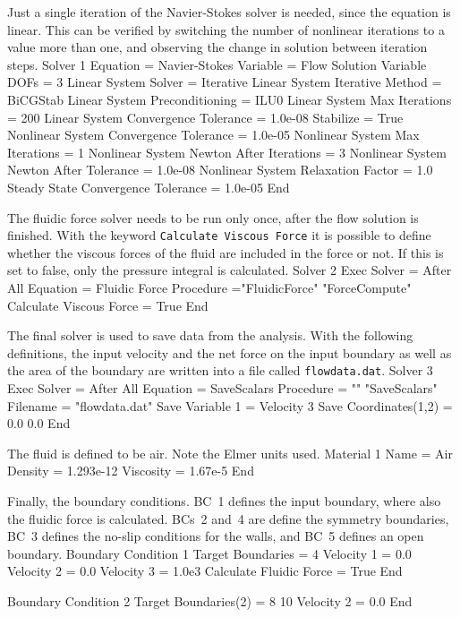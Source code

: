 Just a single iteration of the Navier-Stokes solver is needed, since
the equation is linear. This can be verified by switching the number
of nonlinear iterations to a value more than one, and observing the
change in solution between iteration steps.
\ttbegin
Solver 1
   Equation = Navier-Stokes
   Variable = Flow Solution
   Variable DOFs = 3
   Linear System Solver = Iterative
   Linear System Iterative Method = BiCGStab
   Linear System Preconditioning = ILU0
   Linear System Max Iterations = 200
   Linear System Convergence Tolerance = 1.0e-08
   Stabilize = True
   Nonlinear System Convergence Tolerance = 1.0e-05
   Nonlinear System Max Iterations = 1
   Nonlinear System Newton After Iterations = 3
   Nonlinear System Newton After Tolerance = 1.0e-08
   Nonlinear System Relaxation Factor = 1.0
   Steady State Convergence Tolerance = 1.0e-05
End
\ttend

The fluidic force solver needs to be run only once, after the flow
solution is finished. With the keyword {\tt Calculate Viscous Force} it
is possible to define whether the viscous forces of the fluid are
included in the force or not. If this is set to false, only the
pressure integral is calculated.
\ttbegin
Solver 2
  Exec Solver = After All
  Equation = Fluidic Force
  Procedure  ="FluidicForce" "ForceCompute"
  Calculate Viscous Force = True
End
\ttend

The final solver is used to save data from the analysis. With the
following definitions, the input velocity and the net force on the
input boundary as well as the area of the boundary are written into a
file called {\tt flowdata.dat}.
\ttbegin
Solver 3
  Exec Solver = After All
  Equation = SaveScalars
  Procedure = "" "SaveScalars"
  Filename = "flowdata.dat"
  Save Variable 1 = Velocity 3
  Save Coordinates(1,2) = 0.0 0.0
End
\ttend

The fluid is defined to be air. Note the Elmer  units used.
\ttbegin
Material 1
  Name = Air
  Density = 1.293e-12
  Viscosity = 1.67e-5
End
\ttend

Finally, the boundary conditions. BC~1 defines the input boundary,
where also the fluidic force is calculated. BCs~2 and~4 are define the
symmetry boundaries, BC~3 defines the no-slip conditions for the
walls, and BC~5 defines an open boundary.
\ttbegin
Boundary Condition 1
  Target Boundaries = 4
   Velocity 1 = 0.0
   Velocity 2 = 0.0
   Velocity 3 = 1.0e3
   Calculate Fluidic Force = True
End

Boundary Condition 2
  Target Boundaries(2) = 8 10
   Velocity 2 = 0.0
End

